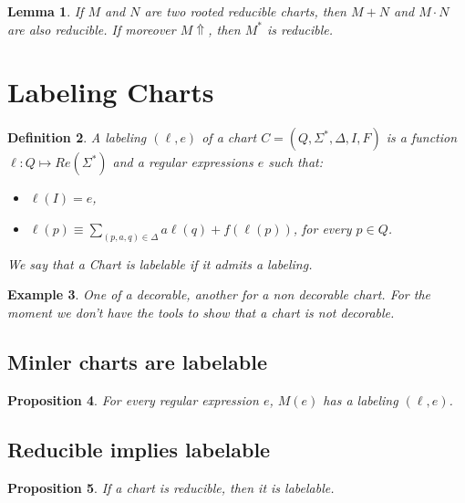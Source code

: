 \documentclass{article}
\newtheorem{definition}{Definition}[section]
\newtheorem{lemma}[definition]{Lemma}
\newtheorem{proposition}[definition]{Proposition}
\newtheorem{example}[definition]{Example}
\begin{document}
\begin{lemma}
  If $M$ and $N$ are two rooted reducible charts, then $M+N$ and $M \cdot N$ are also reducible. 
  If moreover $M \Uparrow$, then $M^*$ is reducible.  
\end{lemma}

\section{Labeling Charts}

\begin{definition}
A \emph{labeling} $(\ell, e)$ of a chart $C=(Q, \Sigma^*, \Delta, I, F)$ is a function 
$\ell:Q \mapsto Re(\Sigma^*)$ 
and a regular expressions $e$ such that:
\begin{itemize}
\item $\ell(I)=e$,
\item $ \ell(p)\equiv\underset{(p,a, q) \in \Delta}{\sum} a \ell(q) + f(\ell(p))$, for every $p\in Q$.
\end{itemize}
 We say that a Chart  is \emph{labelable} if it admits a labeling.
\end{definition}



\begin{example}
    One of a decorable, another for a non decorable chart. For the moment we don't have the tools to show that a chart is not decorable.
\end{example}


\subsection{Minler charts are labelable}
\begin{proposition} For every regular expression $e$, $M(e)$ has a labeling $(\ell,e)$.~\label{prop:milner-chart-is-decorable}
~\label{prop:Milner-is-decorable}\end{proposition}

\subsection{Reducible implies labelable}
\begin{proposition}
    If a chart is reducible, then it is labelable. ~\label{prop:reducible-implies-decorable}
\end{proposition}
\end{document}
